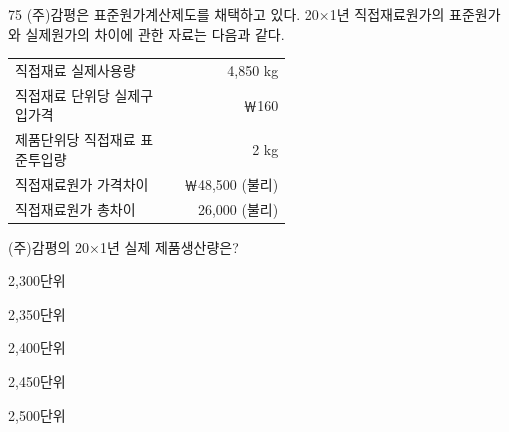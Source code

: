 \begin{question}{75}
(주)감평은 표준원가계산제도를 채택하고 있다. 20×1년 직접재료원가의 표준원가와 실제원가의 차이에 관한 자료는 다음과 같다.
\begin{tcolorbox}[enhanced, colback=white, colframe=black, boxrule=0.4pt, arc=0pt, left=4pt, right=4pt, top=4pt, bottom=4pt]
\begin{tabular}{@{}p{0.55\linewidth}r@{}}
직접재료 실제사용량 & 4,850 kg \\
직접재료 단위당 실제구입가격 & ￦160 \\
제품단위당 직접재료 표준투입량 & 2 kg \\
직접재료원가 가격차이 & ￦48,500 (불리) \\
직접재료원가 총차이 & 26,000 (불리)
\end{tabular}
\end{tcolorbox}
(주)감평의 20×1년 실제 제품생산량은?
\begin{choices}
  \item 2,300단위
  \item 2,350단위
  \item 2,400단위
  \item 2,450단위
  \item 2,500단위
\end{choices}
\end{question}
